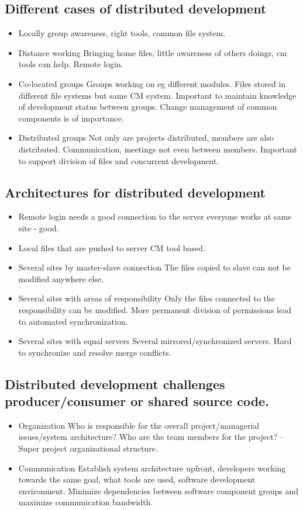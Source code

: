 \subsection{ Different cases of distributed development}
\begin{itemize}
    \item Locally group awareness, right tools, common file system.
    \item Distance working Bringing home files, little awareness of others doings, cm tools can help. Remote login.
    \item Co-located groups Groups working on eg different modules. Files stored in different file systems but same CM system. Important to maintain knowledge of development status between groups. Change management of common components is of importance.
    \item Distributed groups Not only are projects distributed, members are also distributed. Communication, meetings not even between members. Important to support division of files and concurrent development.
\end{itemize}
\subsection{Architectures for distributed development}
\begin{itemize}
    \item Remote login needs a good connection to the server everyone works at same site - good.
    \item Local files that are pushed to server CM tool based.
    \item Several sites by master-slave connection The files copied to slave can not be modified anywhere else.
    \item Several sites with areas of responsibility Only the files connected to the responsibility can be modified. More permanent division of permissions lead to automated synchronization.
    \item Several sites with equal servers Several mirrored/synchronized servers. Hard to synchronize and resolve merge conflicts.
\end{itemize}


\subsection{Distributed development challenges producer/consumer or shared source code.}
\begin{itemize}
    \item Organization Who is responsible for the overall project/managerial issues/system architecture? Who are the team members for the project? -- Super project organizational structure.
    \item Communication Establish system architecture upfront, developers working towards the same goal, what tools are used, software development environment. Minimize dependencies between software component groups and maximize communication bandwidth.
\end{itemize}
